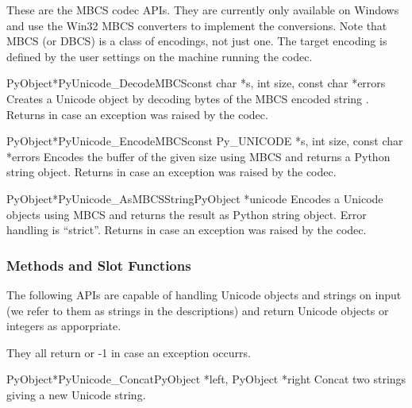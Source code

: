 \documentclass{manual}
\begin{document}

These are the MBCS codec APIs. They are currently only available on
Windows and use the Win32 MBCS converters to implement the
conversions.  Note that MBCS (or DBCS) is a class of encodings, not
just one.  The target encoding is defined by the user settings on the
machine running the codec.

\begin{cfuncdesc}{PyObject*}{PyUnicode_DecodeMBCS}{const char *s,
                                               int size,
                                               const char *errors}
Creates a Unicode object by decoding  bytes of the MBCS
encoded string .  Returns \NULL{} in case an exception was
raised by the codec.
\end{cfuncdesc}

\begin{cfuncdesc}{PyObject*}{PyUnicode_EncodeMBCS}{const Py_UNICODE *s,
                                               int size,
                                               const char *errors}
Encodes the  buffer of the given size using MBCS
and returns a Python string object.  Returns \NULL{} in case an
exception was raised by the codec.
\end{cfuncdesc}

\begin{cfuncdesc}{PyObject*}{PyUnicode_AsMBCSString}{PyObject *unicode}
Encodes a Unicode objects using MBCS and returns the result as Python
string object.  Error handling is ``strict''.  Returns \NULL{} in case
an exception was raised by the codec.
\end{cfuncdesc}


\subsubsection{Methods and Slot Functions \label{unicodeMethodsAndSlots}}

The following APIs are capable of handling Unicode objects and strings
on input (we refer to them as strings in the descriptions) and return
Unicode objects or integers as apporpriate.

They all return \NULL{} or -1 in case an exception occurrs.

\begin{cfuncdesc}{PyObject*}{PyUnicode_Concat}{PyObject *left,
                                               PyObject *right}
Concat two strings giving a new Unicode string.
\end{cfuncdesc}
\end{document}
